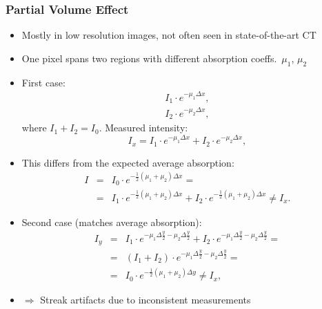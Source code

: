 \begin{frame}[allowframebreaks]
	\frametitle{Partial Volume Effect}
	\hspace{-0.3cm}

	\begin{itemize}
		\item Mostly in low resolution images, not often seen in state-of-the-art CT
		\item One pixel spans two regions with different absorption coeffs.~$\mu_1$, $\mu_2$
		\item First case:
		      \begin{eqnarray}
			      I_1 \cdot e^{-\mu_1\Delta x},\\
			      I_2 \cdot e^{-\mu_2\Delta x},
		      \end{eqnarray}
		      where $I_1 + I_2 = I_0$. Measured intensity:
		      \begin{equation}
			      \label{eq:ct_partial1}
			      I_x = I_1 \cdot e^{-\mu_1\Delta x} + I_2 \cdot e^{-\mu_2 \Delta x},
		      \end{equation}

		\item This differs from the expected average absorption:
		      \begin{eqnarray}
			      I &=& I_0 \cdot e^{- \frac{1}{2}(\mu_1 + \mu_2) \Delta x} =\\
			      &=& I_1 \cdot e^{- \frac{1}{2}(\mu_1 + \mu_2) \Delta x} + I_2 \cdot e^{- \frac{1}{2}(\mu_1 + \mu_2) \Delta x} \neq I_x.
		      \end{eqnarray}

		\item Second case (matches average absorption):
		      \begin{eqnarray}
			      I_y &=& I_1 \cdot e^{-\mu_1\Delta\frac{y}{2} - \mu_2\Delta\frac{y}{2}} +I_2 \cdot e^{-\mu_1\Delta\frac{y}{2} - \mu_2\Delta\frac{y}{2}} = \\
			      &=& (I_1 + I_2) \cdot e^{-\mu_1\Delta\frac{y}{2} - \mu_2\Delta\frac{y}{2}} =\\
			      &=& I_0 \cdot e^{-\frac{1}{2}(\mu_1 + \mu_2)\Delta y} \neq I_x,
		      \end{eqnarray}
		\item[ ] $\Rightarrow$ Streak artifacts due to inconsistent measurements

	\end{itemize}

\end{frame}
